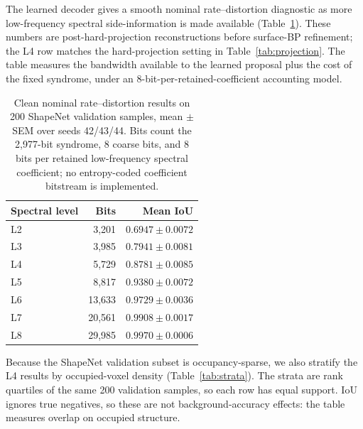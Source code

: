 \documentclass[11pt,a4paper]{article}
\begin{document}
The learned decoder gives a smooth nominal rate--distortion diagnostic as more
low-frequency spectral side-information is made available
(Table~\ref{tab:rate-distortion}). These numbers are post-hard-projection
reconstructions before surface-BP refinement; the L4 row matches the
hard-projection setting in Table~\ref{tab:projection}. The table measures the
bandwidth available to the learned proposal plus the cost of the fixed
syndrome, under an 8-bit-per-retained-coefficient accounting model.

\begin{table}[htbp]
\centering
\caption{Clean nominal rate--distortion results on 200 ShapeNet validation
samples, mean $\pm$ SEM over seeds 42/43/44. Bits count the 2{,}977-bit
syndrome, 8 coarse bits, and 8 bits per retained low-frequency spectral
coefficient; no entropy-coded coefficient bitstream is implemented.}
\label{tab:rate-distortion}
\begin{tabular}{lrr}
\toprule
Spectral level & Bits & Mean IoU \\
\midrule
L2 & 3{,}201 & $0.6947 \pm 0.0072$ \\
L3 & 3{,}985 & $0.7941 \pm 0.0081$ \\
L4 & 5{,}729 & $0.8781 \pm 0.0085$ \\
L5 & 8{,}817 & $0.9380 \pm 0.0072$ \\
L6 & 13{,}633 & $0.9729 \pm 0.0036$ \\
L7 & 20{,}561 & $0.9908 \pm 0.0017$ \\
L8 & 29{,}985 & $0.9970 \pm 0.0006$ \\
\bottomrule
\end{tabular}
\end{table}

Because the ShapeNet validation subset is occupancy-sparse, we also stratify
the L4 results by occupied-voxel density (Table~\ref{tab:strata}). The strata
are rank quartiles of the same 200 validation samples, so each row has equal
support. IoU ignores true negatives, so these are not background-accuracy
effects: the table measures overlap on occupied structure.
\end{document}
